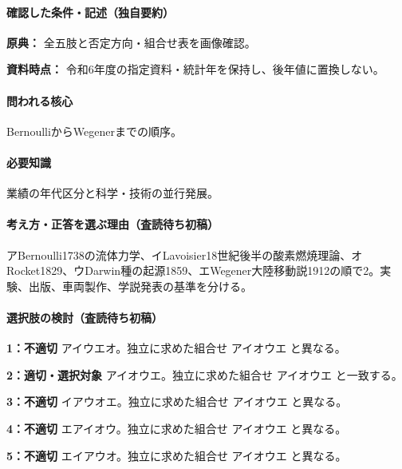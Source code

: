 \paragraph{確認した条件・記述（独自要約）}\mbox{}\par

\noindent\textbf{原典：} 全五肢と否定方向・組合せ表を画像確認。\par

\noindent\textbf{資料時点：} 令和6年度の指定資料・統計年を保持し、後年値に置換しない。\par

\paragraph{問われる核心} BernoulliからWegenerまでの順序。

\paragraph{必要知識} 業績の年代区分と科学・技術の並行発展。

\paragraph{考え方・正答を選ぶ理由（査読待ち初稿）} アBernoulli1738の流体力学、イLavoisier18世紀後半の酸素燃焼理論、オRocket1829、ウDarwin種の起源1859、エWegener大陸移動説1912の順で2。実験、出版、車両製作、学説発表の基準を分ける。

\paragraph{選択肢の検討（査読待ち初稿）}\mbox{}\par

\noindent\textbf{1：不適切} アイウエオ。独立に求めた組合せ アイオウエ と異なる。\par

\noindent\textbf{2：適切・選択対象} アイオウエ。独立に求めた組合せ アイオウエ と一致する。\par

\noindent\textbf{3：不適切} イアウオエ。独立に求めた組合せ アイオウエ と異なる。\par

\noindent\textbf{4：不適切} エアイオウ。独立に求めた組合せ アイオウエ と異なる。\par

\noindent\textbf{5：不適切} エイアウオ。独立に求めた組合せ アイオウエ と異なる。\par

